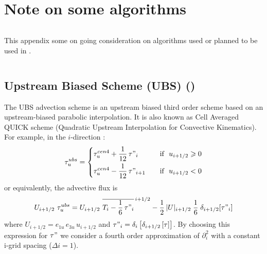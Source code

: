 \documentclass[../tex_main/NEMO_manual]{subfiles}
\begin{document}
\chapter{Note on some algorithms}
\label{apdx:E}
\minitoc

\newpage
$\ $\newline    %
 
 This appendix some on going consideration on algorithms used or planned to be used
in \NEMO. 

$\ $\newline    %

\section{Upstream Biased Scheme (UBS) (\protect{})}
\label{sec:TRA_adv_ubs}

The UBS advection scheme is an upstream biased third order scheme based on 
an upstream-biased parabolic interpolation. It is also known as Cell Averaged 
QUICK scheme (Quadratic Upstream Interpolation for Convective 
Kinematics). For example, in the $i$-direction :
\begin{equation} \label{eq:tra_adv_ubs2}
\tau _u^{ubs} = \left\{	 \begin{aligned}
  & \tau _u^{cen4} + \frac{1}{12} \,\tau"_i	   & \quad \text{if }\ u_{i+1/2} \geqslant 0 \\
  & \tau _u^{cen4} - \frac{1}{12} \,\tau"_{i+1} & \quad \text{if }\ u_{i+1/2}       <       0
  						 \end{aligned}    \right.
\end{equation}
or equivalently, the advective flux is
\begin{equation} \label{eq:tra_adv_ubs2}
U_{i+1/2} \ \tau _u^{ubs} 
=U_{i+1/2} \ \overline{ T_i - \frac{1}{6}\,\tau"_i }^{\,i+1/2}
- \frac{1}{2}\, |U|_{i+1/2} \;\frac{1}{6} \;\delta_{i+1/2}[\tau"_i]
\end{equation}
where $U_{i+1/2} = e_{1u}\,e_{3u}\,u_{i+1/2}$ and 
$\tau "_i =\delta _i \left[ {\delta _{i+1/2} \left[ \tau \right]} \right]$. 
By choosing this expression for $\tau "$ we consider a fourth order approximation 
of $\partial_i^2$ with a constant i-grid spacing ($\Delta i=1$). 
\end{document}
